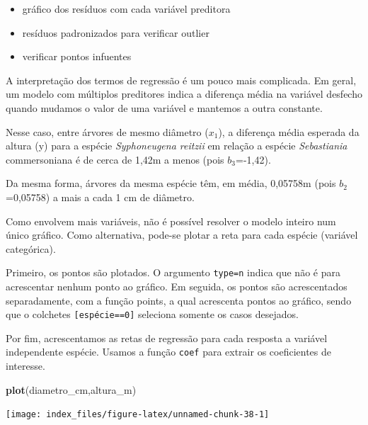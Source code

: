 \documentclass[12pt,brazil,oneside]{book}
\newenvironment{Shaded}{\begin{snugshade}}{\end{snugshade}}
\newcommand{\KeywordTok}[1]{\textcolor[rgb]{0.13,0.29,0.53}{\textbf{#1}}}
\newcommand{\NormalTok}[1]{#1}
\providecommand{\tightlist}{%
  \setlength{\itemsep}{0pt}\setlength{\parskip}{0pt}}
\begin{document}
\begin{itemize}
\tightlist
\item
  gráfico dos resíduos com cada variável preditora
\item
  resíduos padronizados para verificar outlier
\item
  verificar pontos infuentes
\end{itemize}

A interpretação dos termos de regressão é um pouco mais complicada. Em
geral, um modelo com múltiplos preditores indica a diferença média na
variável desfecho quando mudamos o valor de uma variável e mantemos a
outra constante.

Nesse caso, entre árvores de mesmo diâmetro (\(x_1\)), a diferença média
esperada da altura (y) para a espécie \emph{Syphoneugena reitzii} em
relação a espécie \emph{Sebastiania} commersoniana é de cerca de 1,42m a
menos (pois \(b_3\)=-1,42).

Da mesma forma, árvores da mesma espécie têm, em média, 0,05758m (pois
\(b_2\)=0,05758) a mais a cada 1 cm de diâmetro.

Como envolvem mais variáveis, não é possível resolver o modelo inteiro
num único gráfico. Como alternativa, pode-se plotar a reta para cada
espécie (variável categórica).

Primeiro, os pontos são plotados. O argumento
\texttt{type=\textquotesingle{}n\textquotesingle{}} indica que não é
para acrescentar nenhum ponto ao gráfico. Em seguida, os pontos são
acrescentados separadamente, com a função points, a qual acrescenta
pontos ao gráfico, sendo que o colchetes \texttt{{[}espécie==0{]}}
seleciona somente os casos desejados.

Por fim, acrescentamos as retas de regressão para cada resposta a
variável independente espécie. Usamos a função \texttt{coef} para
extrair os coeficientes de interesse.

\begin{Shaded}
\begin{Highlighting}[]
\KeywordTok{plot}\NormalTok{(diametro_cm,altura_m)}
\end{Highlighting}
\end{Shaded}

\begin{center}\texttt{[image: index\_files/figure-latex/unnamed-chunk-38-1]} \end{center}
\end{document}
